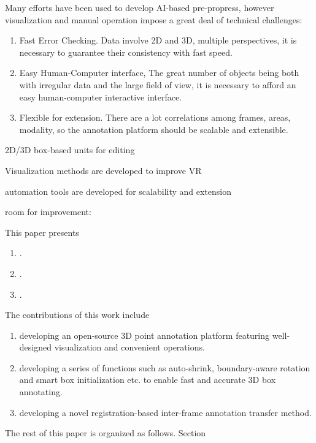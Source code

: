 \documentclass[letterpaper, 10 pt, conference]{ieeeconf}  %
\begin{document}
Many efforts have been used to develop AI-based pre-propress, however
visualization and manual operation impose a great deal of technical challenges:
\begin{enumerate}
\item  Fast Error Checking. Data involve 2D and 3D, multiple perspectives, it is necessary to guarantee their consistency with fast speed.
\item  Easy Human-Computer interface, The great number of objects being both with irregular data and the large field of view, it is necessary to afford an easy human-computer interactive interface. 
\item  Flexible for extension. There are a lot correlations among frames, areas, modality, so the annotation platform should be scalable and extensible.
\end{enumerate}

2D/3D box-based units for editing 

Visualization methods are developed to improve VR

automation tools are developed for scalability and extension 

room for improvement: 

This paper presents 
\begin{enumerate}
	
	\item.
	\item.
	\item.
	
\end{enumerate}

The contributions of this work include
\begin{enumerate}

	\item developing an open-source 3D point annotation platform featuring  well-designed visualization and convenient operations.
	\item developing a series of functions such as auto-shrink, boundary-aware rotation and smart box initialization etc. to enable fast and accurate 3D box annotating.
	\item developing a novel registration-based inter-frame annotation transfer method.
\end{enumerate}

The rest of this paper is organized as follows. Section
\end{document}
